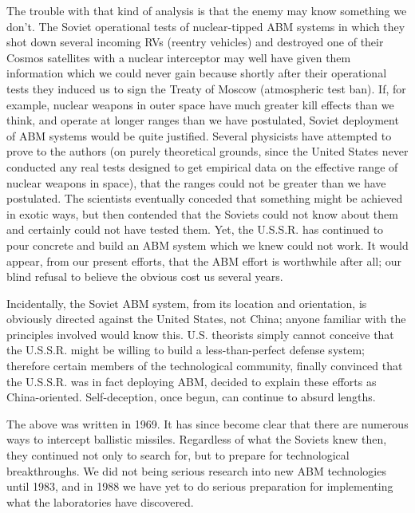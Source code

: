 The trouble with that kind of analysis is that the enemy may know something we don't. The Soviet operational tests of nuclear-tipped ABM systems in which they shot down several incoming RVs (reentry vehicles) and destroyed one of their Cosmos satellites with a nuclear interceptor may well have given them information which we could never gain because shortly after their operational tests they induced us to sign the Treaty of Moscow (atmospheric test ban). If, for example, nuclear weapons in outer space have much greater kill effects than we think, and operate at longer ranges than we have postulated, Soviet deployment of ABM systems would be quite justified. Several physicists have attempted to prove to the authors (on purely theoretical grounds, since the United States never conducted any real tests designed to get empirical data on the effective range of nuclear weapons in space), that the ranges could not be greater than we have postulated. The scientists eventually conceded that something might be achieved in exotic ways, but then contended that the Soviets could not know about them and certainly could not have tested them. Yet, the U.S.S.R. has continued to pour concrete and build an ABM system which we knew could not work. It would appear, from our present efforts, that the ABM effort is worthwhile after all; our blind refusal to believe the obvious cost us several years.

Incidentally, the Soviet ABM system, from its location and orientation, is obviously directed against the United States, not China; anyone familiar with the principles involved would know this. U.S. theorists simply cannot conceive that the U.S.S.R. might be willing to build a less-than-perfect defense system; therefore certain members of the technological community, finally convinced that the U.S.S.R. was in fact deploying ABM, decided to explain these efforts as China-oriented. Self-deception, once begun, can continue to absurd lengths.

\begin{mdframed}[backgroundcolor=black!10]
The above was written in 1969. It has since become clear that there are numerous ways to intercept ballistic missiles. Regardless of what the Soviets knew then, they continued not only to search for, but to prepare for technological breakthroughs. We did not being serious research into new ABM technologies until 1983, and in 1988 we have yet to do serious preparation for implementing what the laboratories have discovered.
\end{mdframed}
